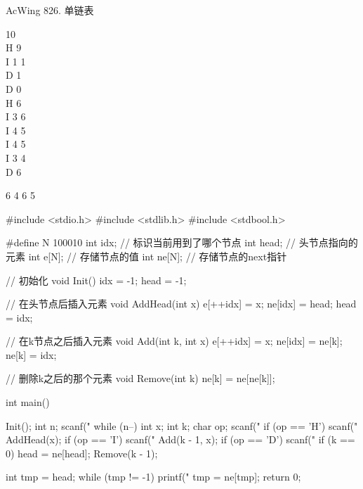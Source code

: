\begin{titledbox}{AcWing 826. 单链表}
    \begin{inputblock}
        10 \\
        H 9 \\
        I 1 1 \\
        D 1 \\
        D 0 \\
        H 6 \\
        I 3 6 \\
        I 4 5 \\
        I 4 5 \\
        I 3 4 \\
        D 6
    \end{inputblock}
    \begin{outputblock}
        6 4 6 5
    \end{outputblock}
\end{titledbox}

\begin{mycpptwocol}
    #include <stdio.h>
    #include <stdlib.h>
    #include <stdbool.h>

    #define N 100010
    int idx; // 标识当前用到了哪个节点
    int head; // 头节点指向的元素
    int e[N]; // 存储节点的值
    int ne[N]; // 存储节点的next指针

    // 初始化
    void Init()
        {
        idx = -1;
        head = -1;
    }

    // 在头节点后插入元素
    void AddHead(int x) {
        e[++idx] = x;
        ne[idx] = head;
        head = idx;
    }

    // 在k节点之后插入元素
    void Add(int k, int x)
        {
        e[++idx] = x;
        ne[idx] = ne[k];
        ne[k] = idx;
    }

    // 删除k之后的那个元素
    void Remove(int k) {
        ne[k] = ne[ne[k]];
    }

    int main()
        {
        Init();
        int n;
        scanf("%
        while (n--) {
            int x;
            int k;
            char op;
            scanf(" %
            if (op == 'H') {
                scanf("%
                AddHead(x);
            }
            if (op == 'I') {
                scanf("%
                Add(k - 1, x);
            }
            if (op == 'D') {
                scanf("%
                if (k == 0) {
                    head = ne[head];
                }
                Remove(k - 1);
            }
        }

        int tmp = head;
        while (tmp != -1) {
            printf("%
            tmp = ne[tmp];
        }
        return 0;
    }
\end{mycpptwocol}


